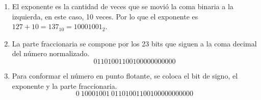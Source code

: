 \documentclass[20pt,margin=1in,innermargin=-4.5in,blockverticalspace=-0.25in]{tikzposter}
\begin{document}
\begin{columns}
{\begin{enumerate}
\begin{itemize}
                \item \textbf{Sin normalizar:} $1011010011.001 \times 2^0$
                \item \textbf{Normalizado:} $1.011010011001 \times 2^{10}$
            \end{itemize}
            \item El exponente es la cantidad de veces que se movió la coma binaria a la izquierda, en este caso, 10 veces. Por lo que el exponente es $127 + 10 = 137_{10} = 10001001_2$.
            \item La parte fraccionaria se compone por los 23 bits que siguen a la coma decimal del número normalizado.
            \begin{equation*}
                01101001100100000000000
            \end{equation*}
            \item Para conformar el número en punto flotante, se coloca el bit de signo, el exponente y la parte fraccionaria.
            \begin{equation*}
                0 \ 10001001 \ 01101001100100000000000
            \end{equation*}
        \end{enumerate}   
    }
\end{columns}
\end{document}

